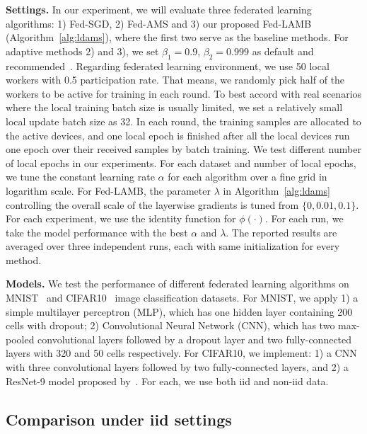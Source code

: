 \documentclass[twoside]{article}
\begin{document}
\vspace{0.1in}
\noindent\textbf{Settings.} In our experiment, we will evaluate three federated learning algorithms: 1) Fed-SGD, 2) Fed-AMS and 3) our proposed Fed-LAMB (Algorithm~\ref{alg:ldams}), where the first two serve as the baseline methods. For adaptive methods 2) and 3), we set $\beta_1=0.9$, $\beta_2=0.999$ as default and recommended~\citep{reddi2019convergence}. Regarding federated learning environment, we use 50 local workers with 0.5 participation rate. That means, we randomly pick half of the workers to be active for training in each round. To best accord with real scenarios where the local training batch size is usually limited, we set a relatively small local update batch size as 32. In each round, the training samples are allocated to the active devices, and one local epoch is finished after all the local devices run one epoch over their received samples by batch training. We test different number of local epochs in our experiments. For each dataset and number of local epochs, we tune the constant learning rate $\alpha$ for each algorithm over a fine grid in logarithm scale. For Fed-LAMB, the parameter $\lambda$ in Algorithm~\ref{alg:ldams} controlling the overall scale of the layerwise gradients is tuned from $\{0,0.01,0.1\}$. 
For each experiment, we use the identity function for $\phi(\cdot)$.
For each run, we take the model performance with the best $\alpha$ and $\lambda$. The reported results are averaged over three independent runs, each with same initialization for every method.

\vspace{0.1in}
\noindent\textbf{Models.} We test the performance of different federated learning algorithms on MNIST~\citep{lecun1998mnist} and CIFAR10~\citep{krizhevsky2009learning} image classification datasets. For MNIST, we apply 1) a simple multilayer perceptron (MLP), which has one hidden layer containing 200 cells with dropout; 2) Convolutional Neural Network (CNN), which has two max-pooled convolutional layers followed by a dropout layer and two fully-connected layers with 320 and 50 cells respectively. For CIFAR10, we implement: 1) a CNN with three convolutional layers followed by two fully-connected layers, and 2) a ResNet-9 model proposed by~\cite{Proc:He-resnet16}. 
For each, we use both iid and non-iid data.


\subsection{Comparison under iid settings}
\end{document}
